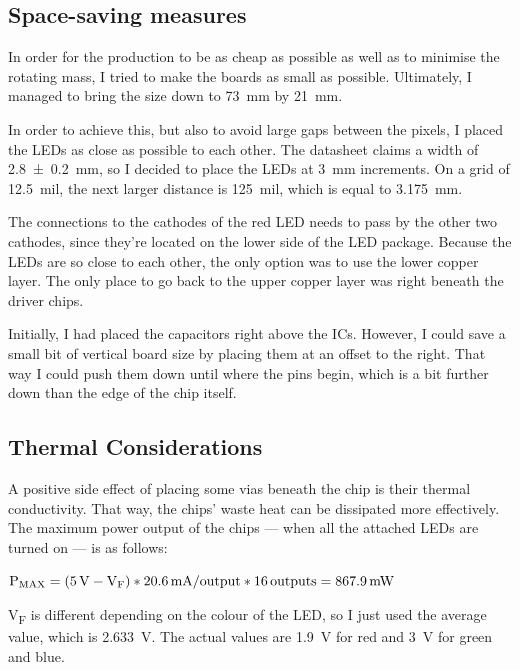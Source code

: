 \documentclass[a4paper, 11pt, titlepage]{report}
\newenvironment{ownmath}
{\vspace{2mm}\hspace{15pt}\begin{math}}
{\end{math}\vspace{2mm}}
\begin{document}
\subsection{Space-saving measures}

In order for the production to be as cheap as possible as well as to minimise the rotating mass, I
tried to make the boards as small as possible. Ultimately, I managed to bring the size down to
\SI{73}{\milli\meter} by \SI{21}{\milli\meter}.

In order to achieve this, but also to avoid large gaps between the pixels, I placed the LEDs as
close as possible to each other. The datasheet claims a width of \SI{2.8 +- 0.2}{\milli\meter},
so I decided to place the LEDs at \SI{3}{\milli\metre} increments. On a grid of \SI{12.5}{mil},
the next larger distance is \SI{125}{mil}, which is equal to \SI{3.175}{mm}.

The connections to the cathodes of the red LED needs to pass by the other two cathodes, since
they're located on the lower side of the LED package. Because the LEDs are so close to each other,
the only option was to use the lower copper layer. The only place to go back to the upper copper
layer was right beneath the driver chips.

Initially, I had placed the capacitors right above the ICs. However, I could save a small bit of
vertical board size by placing them at an offset to the right. That way I could push them down
until where the pins begin, which is a bit further down than the edge of the chip itself.


\subsection{Thermal Considerations}

A positive side effect of placing some vias beneath the chip is their thermal conductivity. That
way, the chips' waste heat can be dissipated more effectively. The maximum power output of the
chips --- when all the attached LEDs are turned on --- is as follows:

\begin{ownmath}
\textrm{P\textsubscript{MAX}} = (\SI{5}{\volt} - \textrm{V\textsubscript{F}}) *
\SI{20.6}{\milli\ampere\per output} * \SI{16}{outputs} = \SI{867.9}{\milli\watt}
\end{ownmath}

V\textsubscript{F} is different depending on the colour of the LED, so I just used the average
value, which is \SI{2.633}{\volt}. The actual values are \SI{1.9}{\volt} for red and \SI{3}{\volt}
for green and blue.
\end{document}
